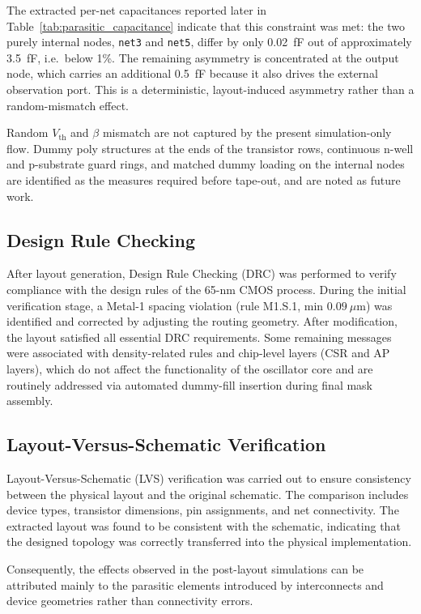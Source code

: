 \documentclass[conference,a4paper]{IEEEtran} %
\begin{document}
The extracted per-net capacitances reported later in
Table~\ref{tab:parasitic_capacitance} indicate that this constraint was met: the
two purely internal nodes, \texttt{net3} and \texttt{net5}, differ by only
0.02~fF out of approximately 3.5~fF, i.e.\ below 1\%. The remaining asymmetry is
concentrated at the output node, which carries an additional 0.5~fF because it
also drives the external observation port. This is a deterministic,
layout-induced asymmetry rather than a random-mismatch effect.

Random $V_{\text{th}}$ and $\beta$ mismatch are not captured by the present
simulation-only flow. Dummy poly structures at the ends of the transistor rows,
continuous n-well and p-substrate guard rings, and matched dummy loading on the
internal nodes are identified as the measures required before tape-out, and are
noted as future work.

\subsection{Design Rule Checking}
After layout generation, Design Rule Checking (DRC) was performed to verify
compliance with the design rules of the 65-nm CMOS process. During the initial
verification stage, a Metal-1 spacing violation (rule M1.S.1, min
$0.09~\mu$m) was identified and corrected by adjusting the routing geometry.
After modification, the layout satisfied all essential DRC requirements. Some
remaining messages were associated with density-related rules and chip-level
layers (CSR and AP layers), which do not affect the functionality of the
oscillator core and are routinely addressed via automated dummy-fill insertion
during final mask assembly.

\subsection{Layout-Versus-Schematic Verification}
Layout-Versus-Schematic (LVS) verification was carried out to ensure consistency
between the physical layout and the original schematic. The comparison includes
device types, transistor dimensions, pin assignments, and net connectivity. The
extracted layout was found to be consistent with the schematic, indicating that
the designed topology was correctly transferred into the physical implementation.

Consequently, the effects observed in the post-layout simulations can be
attributed mainly to the parasitic elements introduced by interconnects and
device geometries rather than connectivity errors.
\end{document}
